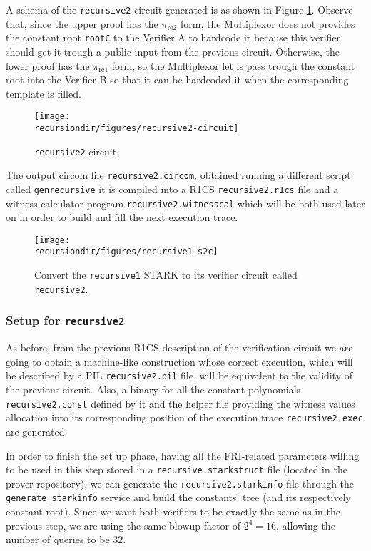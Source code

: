 A schema of the \texttt{recursive2} circuit generated is as shown in Figure \ref{fig:recursive2-circuit}. Observe that, since the upper proof has the $\pi_{\text{re2}}$ form, the Multiplexor does not provides the constant root \texttt{rootC} to the Verifier A to hardcode it because this verifier should get it trough a public input from the previous circuit. Otherwise, the lower proof has the $\pi_{\text{re1}}$ form, so the Multiplexor let is pass trough the constant root into the Verifier B so that it can be hardcoded it when the corresponding template is filled. 

\begin{figure}[H]
	\centering
	\texttt{[image: \\recursiondir/figures/recursive2-circuit]}
	\caption{\texttt{recursive2} circuit.}
	\label{fig:recursive2-circuit}
\end{figure}


The output circom file \texttt{recursive2.circom}, obtained running a different script called \texttt{genrecursive} it is compiled into a R1CS \texttt{recursive2.r1cs} file and a witness calculator program \texttt{recursive2.witnesscal} which will be both used later on in order to build and fill the next execution trace. 

\begin{figure}[H]
\centering
\texttt{[image: \\recursiondir/figures/recursive1-s2c]}
\caption{Convert the \texttt{recursive1} STARK to its verifier circuit called \texttt{recursive2}.}
\label{fig:recursive1-s2c}
\end{figure}




\subsubsection{Setup \ctos for \texttt{recursive2}}

As before, from the previous R1CS description of the verification circuit we are going to obtain a machine-like construction whose correct execution, which will be described by a PIL \texttt{recursive2.pil} file, will be equivalent to the validity of the previous circuit. Also, a binary for all the constant polynomials \texttt{recursive2.const} defined by it and the helper file providing the witness values allocation into its corresponding position of the execution trace \texttt{recursive2.exec} are generated.

In order to finish the set up phase, having all the FRI-related parameters willing to be used in this step stored in a \texttt{recursive.starkstruct} file (located in the prover repository), we can generate the \texttt{recursive2.starkinfo} file through the \texttt{generate\_starkinfo} service and build the constants' tree (and its respectively constant root). Since we want both verifiers to be exactly the same as in the previous step, we are using the same blowup factor of $2^4 = 16$, allowing the number of queries to be $32$. 

